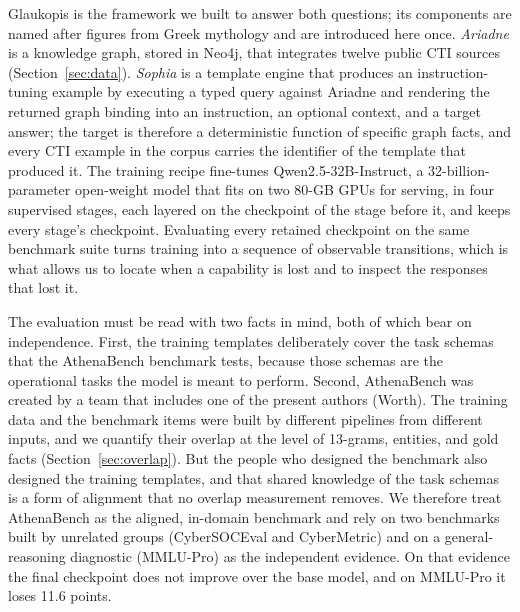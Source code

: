 \documentclass[twocolumn]{svjour3}
\begin{document}
Glaukopis is the framework we built to answer both questions; its components are named after figures from Greek mythology and are introduced here once. \emph{Ariadne} is a knowledge graph, stored in Neo4j, that integrates twelve public CTI sources (Section~\ref{sec:data}). \emph{Sophia} is a template engine that produces an instruction-tuning example by executing a typed query against Ariadne and rendering the returned graph binding into an instruction, an optional context, and a target answer; the target is therefore a deterministic function of specific graph facts, and every CTI example in the corpus carries the identifier of the template that produced it. The training recipe fine-tunes Qwen2.5-32B-Instruct, a 32-billion-parameter open-weight model that fits on two 80-GB GPUs for serving, in four supervised stages, each layered on the checkpoint of the stage before it, and keeps every stage's checkpoint. Evaluating every retained checkpoint on the same benchmark suite turns training into a sequence of observable transitions, which is what allows us to locate when a capability is lost and to inspect the responses that lost it.

The evaluation must be read with two facts in mind, both of which bear on independence. First, the training templates deliberately cover the task schemas that the AthenaBench benchmark tests, because those schemas are the operational tasks the model is meant to perform. Second, AthenaBench was created by a team that includes one of the present authors (Worth). The training data and the benchmark items were built by different pipelines from different inputs, and we quantify their overlap at the level of 13-grams, entities, and gold facts (Section~\ref{sec:overlap}). But the people who designed the benchmark also designed the training templates, and that shared knowledge of the task schemas is a form of alignment that no overlap measurement removes. We therefore treat AthenaBench as the aligned, in-domain benchmark and rely on two benchmarks built by unrelated groups (CyberSOCEval and CyberMetric) and on a general-reasoning diagnostic (MMLU-Pro) as the independent evidence. On that evidence the final checkpoint does not improve over the base model, and on MMLU-Pro it loses 11.6 points.
\end{document}
